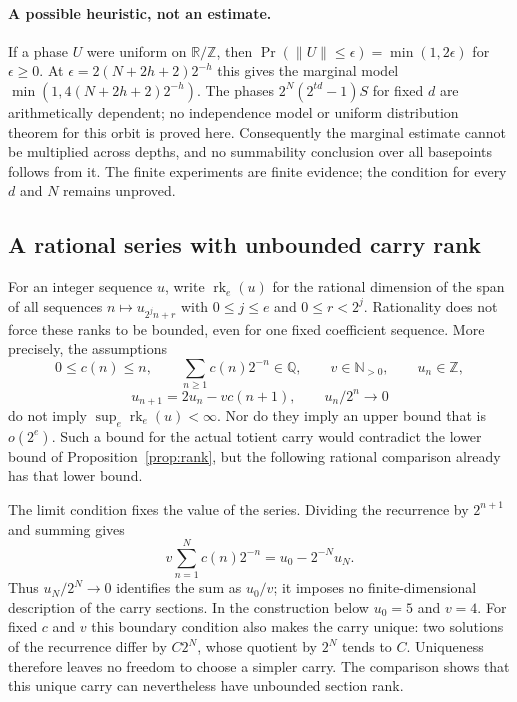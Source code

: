 \documentclass[11pt]{article}
\theoremstyle{plain}
\theoremstyle{definition}
\theoremstyle{remark}
\newcommand{\N}{\mathbb{N}}
\newcommand{\Z}{\mathbb{Z}}
\newcommand{\Q}{\mathbb{Q}}
\newcommand{\R}{\mathbb{R}}
\begin{document}
\paragraph{A possible heuristic, not an estimate.}
If a phase $U$ were uniform on $\R/\Z$, then
$\Pr(\|U\|\le\epsilon)=\min(1,2\epsilon)$ for $\epsilon\ge0$.
At $\epsilon=2(N+2h+2)2^{-h}$ this gives the marginal model
$\min(1,4(N+2h+2)2^{-h})$. The phases
$2^N(2^{td}-1)S$ for fixed $d$ are arithmetically dependent; no independence
model or uniform distribution theorem for this orbit is proved here.
Consequently the marginal estimate cannot be multiplied across depths, and
no summability conclusion over all basepoints follows from it. The finite
experiments are finite evidence; the condition for every $d$ and $N$
remains unproved.

\subsection{A rational series with unbounded carry rank}
\label{sub:generic-carry-rank}

For an integer sequence $u$, write $\operatorname{rk}_e(u)$ for the
rational dimension of the span of all sequences
$n\mapsto u_{2^j n+r}$ with $0\le j\le e$ and $0\le r<2^j$.
Rationality does not force these ranks to be bounded, even for one fixed
coefficient sequence. More precisely, the assumptions
\[
 0\le c(n)\le n,\qquad \sum_{n\ge1}c(n)2^{-n}\in\Q,
 \qquad v\in\N_{>0},\qquad u_n\in\Z,
\]
\[
 u_{n+1}=2u_n-vc(n+1),\qquad u_n/2^n\longrightarrow0
\]
do not imply $\sup_e\operatorname{rk}_e(u)<\infty$. Nor do they imply
an upper bound that is $o(2^e)$. Such a bound for the actual totient
carry would contradict the lower bound of Proposition~\ref{prop:rank},
but the following rational comparison already has that lower bound.

The limit condition fixes the value of the series. Dividing the
recurrence by $2^{n+1}$ and summing gives
\[
 v\sum_{n=1}^{N}c(n)2^{-n}=u_0-2^{-N}u_N.
\]
Thus $u_N/2^N\to0$ identifies the sum as $u_0/v$; it imposes no
finite-dimensional description of the carry sections. In the
construction below $u_0=5$ and $v=4$.
For fixed $c$ and $v$ this boundary condition also makes the carry
unique: two solutions of the recurrence differ by $C2^N$, whose
quotient by $2^N$ tends to $C$. Uniqueness therefore leaves no freedom
to choose a simpler carry. The comparison shows that this unique
carry can nevertheless have unbounded section rank.
\end{document}
